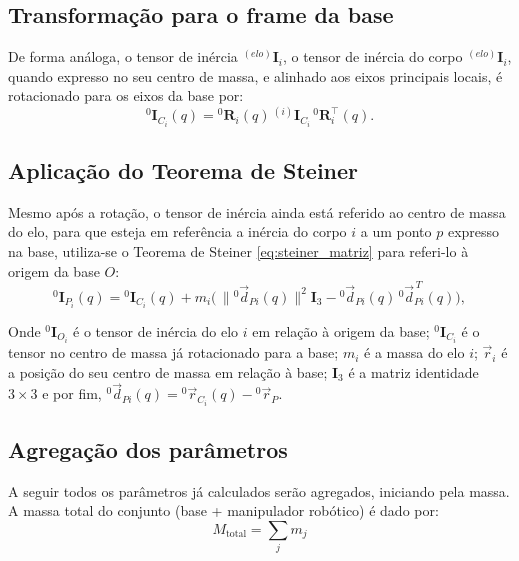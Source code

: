 \subsection{Transformação para o frame da base}
De forma análoga, o tensor de inércia ${}^{(elo)}\mathbf{I}_{i}$, o tensor de inércia do corpo ${}^{(elo)}\mathbf{I}_{i}$, quando expresso no seu centro de massa, e alinhado aos eixos principais locais, é rotacionado para os eixos da base por:
\begin{equation}
{}^{0}\!\mathbf I_{C_i}(q)= {}^{0}\!\mathbf R_i(q)\,{}^{(i)}\!\mathbf I_{C_i}\,{}^{0}\!\mathbf R_i^{\top}(q).
\label{eq:I_rot_base}
\end{equation}

\subsection{Aplicação do Teorema de Steiner}
Mesmo após a rotação, o tensor de inércia ainda está referido ao centro de massa do elo, para que esteja em referência a inércia do corpo $i$ a um ponto $p$ expresso na base, utiliza-se o Teorema de Steiner \eqref{eq:steiner_matriz} para referi-lo à origem da base $O$:
\begin{equation}
{}^{0}\!\mathbf I_{P_i}(q)
= {}^{0}\!\mathbf I_{C_i}(q)+ m_i\big(\,\|{}^{0}\!\vec d_{Pi}(q)\|^2\mathbf I_3-{}^{0}\!\vec d_{Pi}(q)\,{}^{0}\!\vec d_{Pi}^{\,T}(q)\big),
\label{eq:steiner_matriz}
\end{equation}

Onde ${}^{0}\mathbf{I}_{O_i}$ é o tensor de inércia do elo $i$ em relação à origem da base;
${}^{0}\mathbf{I}_{C_i}$ é o tensor no centro de massa já rotacionado para a base;
$m_i$ é a massa do elo $i$;
$\vec r_i$ é a posição do seu centro de massa em relação à base;
$\mathbf{I}_3$ é a matriz identidade $3\times 3$ e por fim,
${}^{0}\!\vec d_{Pi}(q)= {}^{0}\!\vec r_{C_i}(q)-{}^{0}\!\vec r_{P}$.


\subsection{Agregação dos parâmetros}
A seguir todos os parâmetros já calculados serão agregados, iniciando pela massa.
A massa total do conjunto (base + manipulador robótico) é dado por:
\begin{equation}
  M_{\text{total}} = \sum_{j} m_j
\end{equation}


